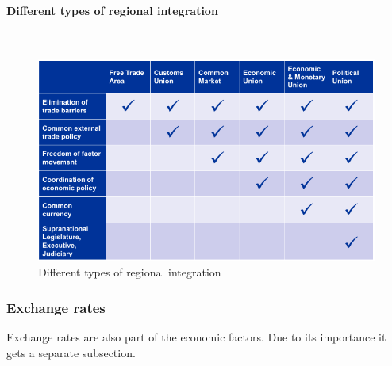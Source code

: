 \paragraph{Different types of regional integration} \mbox{}\\
\begin{figure}[H]
	\centering
	\includegraphics[width=1\textwidth]{figures/typesRegionalIntegration.png}
	\caption{Different types of regional integration}
\end{figure}

\subsubsection{Exchange rates}
Exchange rates are also part of the economic factors. Due to its importance it gets a separate subsection.

